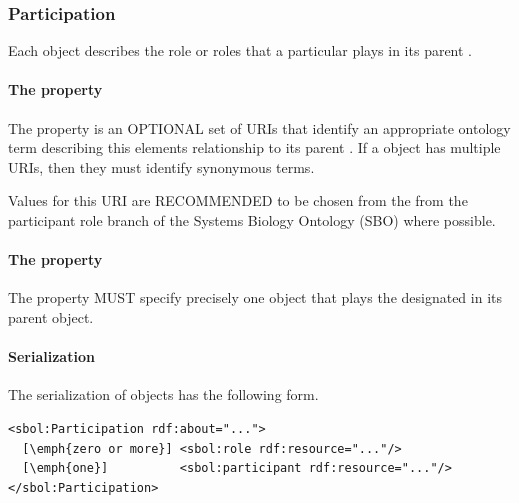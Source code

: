 \subsubsection{Participation}
\label{sec:Participation}


Each  object describes the role or roles that a
particular  plays in its parent
.

\paragraph{The  property}\label{sec:roles}

The  property is an OPTIONAL set of URIs that identify an appropriate ontology term describing this elements relationship to its parent . 
If a  object has multiple
 URIs, then they must identify synonymous terms.

Values for this URI are RECOMMENDED to be chosen from the from the participant role branch of the Systems Biology Ontology (SBO) where possible.


\paragraph{The  property}\label{sec:participant}

The  property MUST specify precisely one  object that plays the designated  in its parent  object.


\paragraph{Serialization}

The serialization of  objects has the following form.
\begin{lstlisting}
<sbol:Participation rdf:about="...">
  [\emph{zero or more}] <sbol:role rdf:resource="..."/>
  [\emph{one}]          <sbol:participant rdf:resource="..."/>
</sbol:Participation>
\end{lstlisting}

